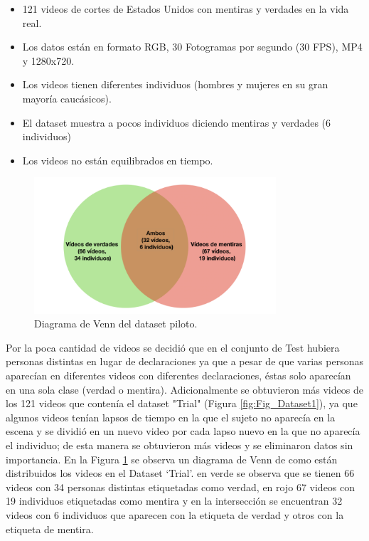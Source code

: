 \begin{onehalfspacing}
\begin{itemize}
    \item 121 videos de cortes de Estados Unidos con mentiras y verdades en la vida real.
    \item Los datos están en formato RGB, 30 Fotogramas por segundo (30 FPS), MP4 y 1280x720.
    \item Los videos tienen diferentes individuos (hombres y mujeres en su gran mayoría caucásicos).
    \item El dataset muestra a pocos individuos diciendo mentiras y verdades (6 individuos)
    \item Los videos no están equilibrados en tiempo.
\end{itemize}

\begin{figure}[th]
	\centering
	\includegraphics[width=9cm,keepaspectratio]{XX_Figures/Fig_Dataset1_Venn.png}
	\caption{\footnotesize Diagrama de Venn del dataset piloto.}
	\label{fig:Fig_Dataset1_Venn}
\end{figure}

Por la poca cantidad de videos se decidió que en el conjunto de Test hubiera personas distintas en lugar de declaraciones ya que a pesar de que varias personas aparecían en diferentes videos con diferentes declaraciones, éstas solo aparecían en una sola clase (verdad o mentira). Adicionalmente se obtuvieron más videos de los 121 videos que contenía el dataset "Trial" (Figura \ref{fig:Fig_Dataset1}), ya que algunos videos tenían lapsos de tiempo en la que el sujeto no aparecía en la escena y se dividió en un nuevo video por cada lapso nuevo en la que no aparecía el individuo; de esta manera se obtuvieron más videos y se eliminaron datos sin importancia.
En la Figura \ref{fig:Fig_Dataset1_Venn} se observa un diagrama de Venn de como están distribuidos los videos en el Dataset `Trial'. en verde se observa que se tienen 66 videos con 34 personas distintas etiquetadas como verdad, en rojo 67 videos con 19 individuos etiquetadas como mentira y en la intersección se encuentran 32 videos con 6 individuos que aparecen con la etiqueta de verdad y otros con la etiqueta de mentira.


\end{onehalfspacing}
